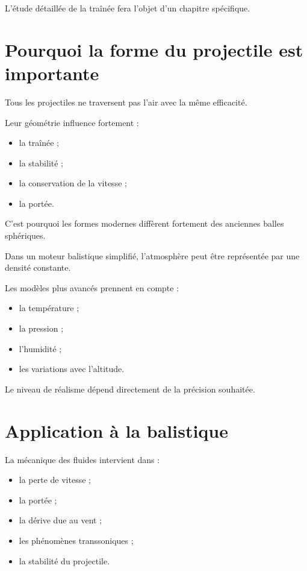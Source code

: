 L'étude détaillée de la traînée fera l'objet d'un chapitre spécifique.

\section{Pourquoi la forme du projectile est importante}

Tous les projectiles ne traversent pas l'air avec la même efficacité.

Leur géométrie influence fortement :

\begin{itemize}
\item la traînée ;
\item la stabilité ;
\item la conservation de la vitesse ;
\item la portée.
\end{itemize}

C'est pourquoi les formes modernes diffèrent fortement des anciennes
balles sphériques.

\begin{simulation}

Dans un moteur balistique simplifié, l'atmosphère peut être représentée
par une densité constante.

Les modèles plus avancés prennent en compte :

\begin{itemize}
\item la température ;
\item la pression ;
\item l'humidité ;
\item les variations avec l'altitude.
\end{itemize}

Le niveau de réalisme dépend directement de la précision souhaitée.

\end{simulation}

\section{Application à la balistique}

La mécanique des fluides intervient dans :

\begin{itemize}
\item la perte de vitesse ;
\item la portée ;
\item la dérive due au vent ;
\item les phénomènes transsoniques ;
\item la stabilité du projectile.
\end{itemize}


